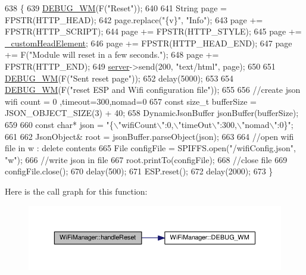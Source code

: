 \begin{DoxyCode}
638                               \{
639   \hyperlink{class_wi_fi_manager_ae5f595c670ccbcf9a191baf50f5c7c26}{DEBUG\_WM}(F(\textcolor{stringliteral}{"Reset"}));
640 
641   String page = FPSTR(HTTP\_HEAD);
642   page.replace(\textcolor{stringliteral}{"\{v\}"}, \textcolor{stringliteral}{"Info"});
643   page += FPSTR(HTTP\_SCRIPT);
644   page += FPSTR(HTTP\_STYLE);
645   page += \hyperlink{class_wi_fi_manager_a8860012564a62209d750c50e56319192}{\_customHeadElement};
646   page += FPSTR(HTTP\_HEAD\_END);
647   page += F(\textcolor{stringliteral}{"Module will reset in a few seconds."});
648   page += FPSTR(HTTP\_END);
649   \hyperlink{class_wi_fi_manager_a509523a01c0395cf0dc235b074f2a5ea}{server}->send(200, \textcolor{stringliteral}{"text/html"}, page);
650 
651   \hyperlink{class_wi_fi_manager_ae5f595c670ccbcf9a191baf50f5c7c26}{DEBUG\_WM}(F(\textcolor{stringliteral}{"Sent reset page"}));
652   delay(5000);
653   
654   \hyperlink{class_wi_fi_manager_ae5f595c670ccbcf9a191baf50f5c7c26}{DEBUG\_WM}(F(\textcolor{stringliteral}{"reset ESP and Wifi configuration file"}));
655 
656  \textcolor{comment}{//create json wifi count = 0 ,timeout=300,nomad=0}
657  \textcolor{keyword}{const} \textcolor{keywordtype}{size\_t} bufferSize = JSON\_OBJECT\_SIZE(3) + 40;
658  DynamicJsonBuffer jsonBuffer(bufferSize);
659 
660  \textcolor{keyword}{const} \textcolor{keywordtype}{char}* json = \textcolor{stringliteral}{"\{\(\backslash\)"wifiCount\(\backslash\)":0,\(\backslash\)"timeOut\(\backslash\)":300,\(\backslash\)"nomad\(\backslash\)":0\}"};
661 
662  JsonObject& root = jsonBuffer.parseObject(json);
663 
664  \textcolor{comment}{//open wifi file in w : delete contents}
665  File configFile = SPIFFS.open(\textcolor{stringliteral}{"/wifiConfig.json"}, \textcolor{stringliteral}{"w"});
666  \textcolor{comment}{//write json in file }
667  root.printTo(configFile);
668  \textcolor{comment}{//close file }
669  configFile.close();
670  delay(500);
671  ESP.reset();
672  delay(2000);
673 \}
\end{DoxyCode}
Here is the call graph for this function\+:\nopagebreak
\begin{figure}[H]
\begin{center}
\leavevmode
\includegraphics[width=350pt]{d4/dc8/class_wi_fi_manager_a94fb1a8fcfbd0d02714c69138bf72f9c_cgraph}
\end{center}
\end{figure}

